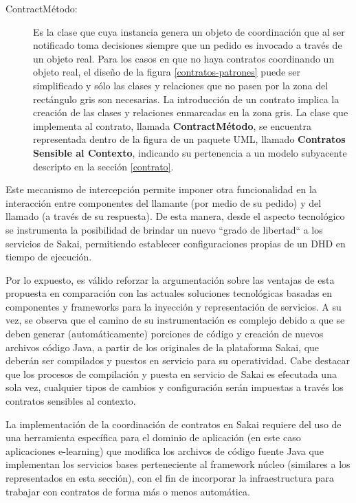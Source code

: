\begin{description}
\item [ContractMétodo:] Es la clase que cuya instancia genera un objeto de
coordinación que al ser notificado toma decisiones siempre que un pedido es
invocado a través de un objeto real.
Para los casos en que no haya contratos coordinando un objeto real, el diseño de
la figura \ref{contratos-patrones} puede ser simplificado y sólo las clases y
relaciones que no pasen por la zona del rectángulo gris son necesarias. La
introducción de un contrato implica la creación de las clases y relaciones
enmarcadas en la zona gris. La clase que implementa al contrato,  llamada
\textbf{ContractMétodo}, se encuentra representada dentro de la figura de un
paquete UML, llamado \textbf{Contratos Sensible al Contexto}, indicando su
pertenencia a un modelo subyacente descripto en la sección \ref{contrato}.
\end{description}

Este mecanismo de intercepción permite imponer otra funcionalidad en la
interacción entre componentes del llamante (por medio de su pedido) y del
llamado (a través de su respuesta). De esta manera, desde el aspecto tecnológico
se instrumenta la posibilidad de brindar un nuevo ``grado de libertad`` a los
servicios de Sakai, permitiendo establecer configuraciones propias de un DHD en
tiempo de ejecución.

Por lo expuesto, es válido reforzar la argumentación sobre las ventajas de esta
propuesta en comparación con las actuales soluciones tecnológicas basadas en
componentes y frameworks para la inyección y representación de servicios. A su
vez, se observa que el camino de su instrumentación es complejo debido a que se
deben generar (automáticamente) porciones de código y creación de nuevos
archivos código Java, a partir de los originales de la plataforma Sakai, que
deberán ser compilados y puestos en servicio para su operatividad. Cabe destacar
que los procesos de compilación y puesta en servicio de Sakai es efecutada una
sola vez, cualquier tipos de cambios y configuración serán impuestas a través
los contratos sensibles al contexto. 

La implementación de la coordinación de contratos en Sakai requiere del uso de
una herramienta específica para el dominio de aplicación (en este caso
aplicaciones e-learning) que modifica los archivos de código fuente Java que
implementan los servicios bases perteneciente al framework núcleo (similares a
los representados en esta sección), con el fin de incorporar la infraestructura
para trabajar con contratos de forma más o menos automática.

